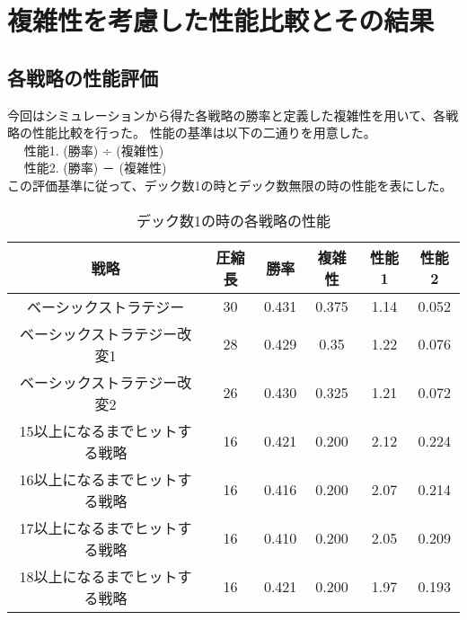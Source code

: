 \section{複雑性を考慮した性能比較とその結果}

\subsection{各戦略の性能評価}

今回はシミュレーションから得た各戦略の勝率と定義した複雑性を用いて、各戦略の性能比較を行った。
性能の基準は以下の二通りを用意した。\\
~~ 性能1. (勝率) ÷ (複雑性)\\
~~ 性能2. (勝率) － (複雑性)\\
この評価基準に従って、デック数1の時とデック数無限の時の性能を表にした。



\begin{table}[H]
\caption{デック数1の時の各戦略の性能}
\label{table:data_type}
\begin{center}
\begin{tabular}{|c|c|c|c|c|c|}
\hline
戦略           & 圧縮長 & 勝率    & 複雑性   & 性能1  & 性能2   \\ \hline
ベーシックストラテジー         & 30  & 0.431 & 0.375 & 1.14 & 0.052 \\ \hline
ベーシックストラテジー改変1      & 28  & 0.429 & 0.35  & 1.22 & 0.076 \\ \hline
ベーシックストラテジー改変2      & 26  & 0.430 & 0.325 & 1.21 & 0.072 \\ \hline
15以上になるまでヒットする戦略 & 16  & 0.421 & 0.200 & 2.12 & 0.224 \\ \hline
16以上になるまでヒットする戦略 & 16  & 0.416 & 0.200 & 2.07 & 0.214 \\ \hline
17以上になるまでヒットする戦略 & 16  & 0.410 & 0.200 & 2.05 & 0.209 \\ \hline
18以上になるまでヒットする戦略 & 16  & 0.421 & 0.200 & 1.97 & 0.193 \\ \hline
\end{tabular}
\end{center}
\end{table}


